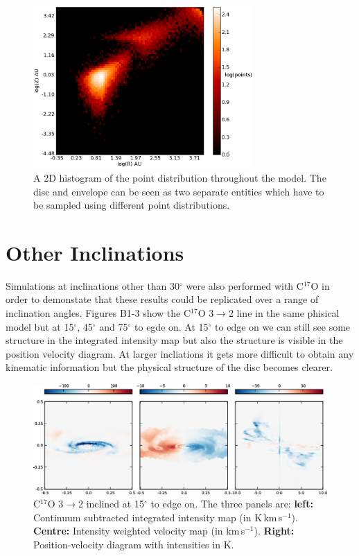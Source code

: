 \documentclass[useAMS,usenatbib]{mn2e}
\begin{document}
\begin{figure}
 \includegraphics[width=84mm]{Figures/model/lime_points_rz_histo2.eps}
 \caption{A 2D histogram of the point distribution throughout the model. The disc and envelope can be seen as two separate entities which have to be sampled using different point distributions.}
 \label{points}
\end{figure}




\section{Other Inclinations} \label{sec:other_inc}

Simulations at inclinations other than 30$^\circ$ were also performed with C$^{17}$O in order to demonstate that these results could be replicated over a range of inclination angles. Figures B1-3 show the C$^{17}$O 3$\rightarrow$2 line in the same phisical model but at 15$^\circ$, 45$^\circ$ and 75$^\circ$ to egde on. At 15$^\circ$ to edge on we can still see some structure in the integrated intensity map but also the structure is visible in the position velocity diagram. At larger incliations it gets more difficult to obtain any kinematic information but the physical structure of the disc becomes clearer.

\begin{figure}
 \includegraphics[width=164mm]{Figures/sim/imageC17O_3-2_15deg_all.eps}

 \caption{C$^{17}$O 3$\rightarrow$2 inclined at 15$^\circ$ to edge on. The three panels are: {\bf left:} Continuum subtracted integrated intensity map (in K$\,$km$\,$s$^{-1}$). {\bf Centre:} Intensity weighted velocity map (in km$\,$s$^{-1}$). {\bf Right:} Position-velocity diagram with intensities in K.}
\end{figure}
\end{document}
